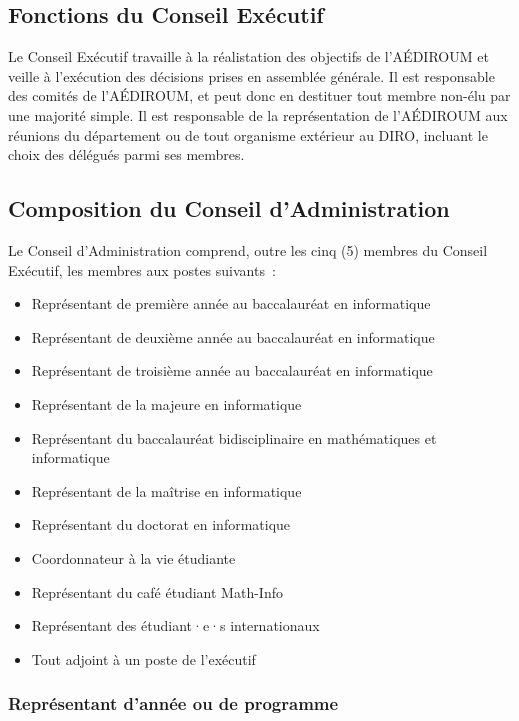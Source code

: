 \documentclass{aediroum}
\begin{document}
\subsection{Fonctions du Conseil Exécutif}\label{sec:fonctions-du-conseil-executif}

Le Conseil Exécutif travaille à la réalistation des objectifs de l'AÉDIROUM et veille à l'exécution des décisions prises en assemblée générale. Il est responsable des comités de l'AÉDIROUM, et peut donc en destituer tout membre non-élu par une majorité simple. Il est responsable de la représentation de l'AÉDIROUM aux réunions du département ou de tout organisme extérieur au DIRO, incluant le choix des délégués parmi ses membres.

\subsection{Composition du Conseil d'Administration}\label{sec:composition-du-conseil-dadministration}

Le Conseil d'Administration comprend, outre les cinq (5) membres du Conseil Exécutif, les membres aux postes suivants~:
\begin{itemize}
\item Représentant de première année au baccalauréat en informatique
\item Représentant de deuxième année au baccalauréat en informatique
\item Représentant de troisième année au baccalauréat en informatique
\item Représentant de la majeure en informatique
\item Représentant du baccalauréat bidisciplinaire en mathématiques et informatique
\item Représentant de la maîtrise en informatique
\item Représentant du doctorat en informatique
\item Coordonnateur à la vie étudiante
\item Représentant du café étudiant Math-Info
\item Représentant des étudiant·e·s internationaux
\item Tout adjoint à un poste de l'exécutif
\end{itemize}

\subsubsection{Représentant d'année ou de programme}\label{sec:representant-dannee-ou-de-programme}
\end{document}
